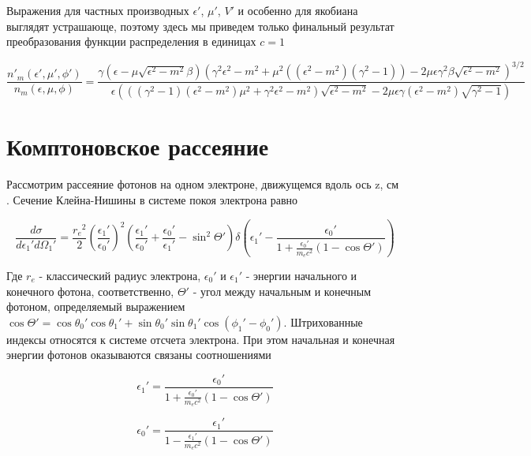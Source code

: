 Выражения для частных производных $\epsilon'$, $\mu'$, $V'$ и особенно для якобиана выглядят устрашающе, поэтому здесь мы приведем только финальный результат преобразования функции распределения в единицах $c = 1$

\begin{equation}
\frac{n'_{m}(\epsilon',\mu',\phi')}{n_{m}(\epsilon,\mu,\phi)}= \frac{\gamma(\epsilon-\mu\sqrt{{\epsilon}^2-m^2}\beta)(\gamma^2\epsilon^2-m^2 + \mu^2 ((\epsilon^2-m^2)(\gamma^2-1)) - 2\mu\epsilon\gamma^2\beta\sqrt{\epsilon^2-m^2})^{3/2}}{\epsilon(((\gamma^2-1)(\epsilon^2-m^2)\mu^2 + \gamma^2\epsilon^2 - m^2)\sqrt{\epsilon^2-m^2}-2\mu\epsilon\gamma(\epsilon^2 - m^2)\sqrt{\gamma^2 - 1})}
\end{equation}

\section{Комптоновское рассеяние}
Рассмотрим рассеяние фотонов на одном электроне, движущемся вдоль ось z, см \cite{Dubus}. Сечение Клейна-Нишины в системе покоя электрона равно

\begin{equation}\label{KleinNishina}
\frac{d\sigma}{d\epsilon_1'd\Omega_1'}=\frac{{r_e}^2}{2}\left(\frac{\epsilon_1'}{\epsilon_0'}\right)^2\left(\frac{\epsilon_1'}{\epsilon_0'}+\frac{\epsilon_0'}{\epsilon_1'}-\sin^2\Theta'\right) \delta\left(\epsilon_1' - \frac{\epsilon_0'}{1+\frac{\epsilon_0'}{m_e c^2}(1 - \cos \Theta')}\right)
\end{equation}

Где $r_e$ - классический радиус электрона, $\epsilon_0'$ и $\epsilon_1'$ - энергии начального и конечного фотона, соответственно, $\Theta'$ - угол между начальным и конечным фотоном, определяемый выражением $\cos\Theta' =\cos \theta_0' \cos \theta_1' + \sin \theta_0' \sin \theta_1' \cos(\phi_1' - \phi_0')$. Штрихованные индексы относятся к системе отсчета электрона. При этом начальная и конечная энергии фотонов оказываются связаны соотношениями

\begin{equation}
	\epsilon_1'=\frac{\epsilon_0'}{1+\frac{\epsilon_0'}{m_e c^2}(1 - \cos \Theta')}	
\end{equation}

\begin{equation}
	\epsilon_0'=\frac{\epsilon_1'}{1-\frac{\epsilon_1'}{m_e c^2}(1 - \cos \Theta')}
\end{equation}

